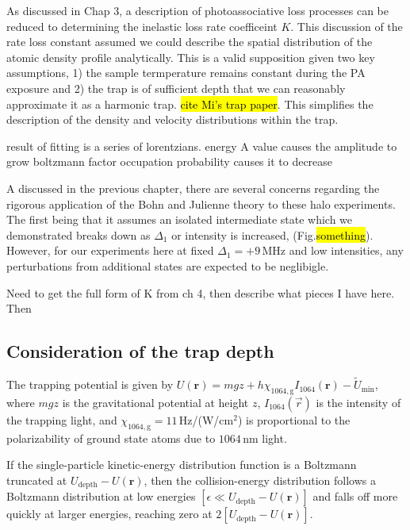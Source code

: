 As discussed in Chap 3, a description of photoassociative loss processes can be reduced to determining the inelastic loss rate coefficeint $K$.
This discussion of the rate loss constant assumed we could describe the spatial distribution of the atomic density profile analytically.
This is a valid supposition given two key assumptions, 1) the sample termperature remains constant during the PA exposure and 2) the trap is of sufficient depth that we can reasonably approximate it as a harmonic trap. \hl{cite Mi's trap paper}.
This simplifies the description of the density and velocity distributions within the trap.



result of fitting is a series of lorentzians.
energy A value causes the amplitude to grow
boltzmann factor occupation probability causes it to decrease

A discussed in the previous chapter, there are several concerns regarding the rigorous application of the Bohn and Julienne theory \cite{bju96} to these halo experiments.
The first being that it assumes an isolated intermediate state which we demonstrated breaks down as $\Delta_1$ or intensity is increased, (Fig.\hl{something}).
However, for our experiments here at fixed $\Delta_1 = +9$\,MHz and low intensities, any perturbations from additional states are expected to be neglibigle.



Need to get the full form of K from ch 4, then describe what pieces I have here. Then 


\subsection{Consideration of the trap depth} \label{sec:trunc_trap}
The trapping potential is given by $U(\mathbf{r})=mgz +h\chi_{1064,\text{g}}I_{1064}(\mathbf{r})-\tilde{U}_{\text{min}}$, where $mgz$ is the gravitational potential at height $z$, $I_{1064}(\vec{r})$ is the intensity of the trapping light, and $\chi_{1064,\text{g}}=11$\,Hz/(W/cm$^2$) \cite{YeKatori2008} is proportional to the polarizability of ground state atoms due to $1064$\,nm light.

If the single-particle kinetic-energy distribution function is a Boltzmann truncated at $U_{\text{depth}}-U(\mathbf{r})$, then the collision-energy distribution follows a Boltzmann distribution at low energies $[\epsilon\ll U_{\text{depth}}-U(\mathbf{r})]$ and falls off more quickly at larger energies, reaching zero at $2[U_{\text{depth}}-U(\mathbf{r})]$.





